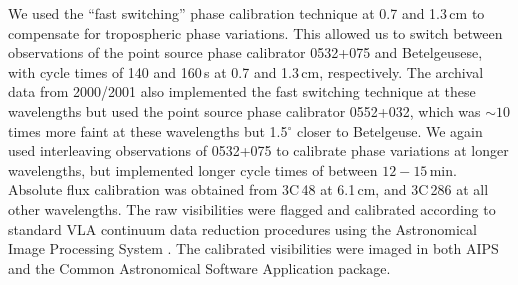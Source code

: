 \documentclass[iop]{emulateapj}
\begin{document}
We used the ``fast switching'' phase calibration technique at 0.7 and 1.3\,cm to compensate for tropospheric phase variations. This allowed us to switch between observations of the point source phase calibrator 0532+075 and Betelgeusese, with cycle times of 140 and 160\,s at 0.7 and 1.3\,cm, respectively. The archival data from 2000/2001 also implemented the fast switching technique at these wavelengths but used the point source phase calibrator 0552+032, which was $\sim 10$ times more faint at these wavelengths but 1.5$^{\circ}$ closer to Betelgeuse. We again used interleaving observations of 0532+075 to calibrate phase variations at longer wavelengths, but implemented longer cycle times of between $12-15$\,min. Absolute flux calibration was obtained from 3C\,48 at 6.1\,cm, and 3C\,286 at all other wavelengths. The raw visibilities were flagged and calibrated according to standard VLA continuum data reduction procedures using the Astronomical Image Processing System \cite[AIPS;][]{greisen_1990}. The calibrated visibilities were imaged in both AIPS and the Common Astronomical Software Application  \cite[CASA;][]{mcmullin_2007} package.
\end{document}
